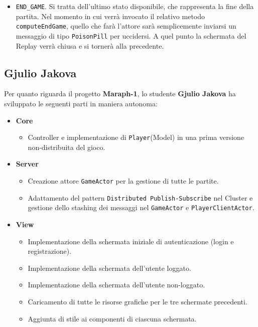 \begin{itemize}
\begin {itemize}
     \item \texttt{END\_GAME}. Si tratta dell'ultimo stato disponibile, che rappresenta la fine della partita. Nel momento in cui verrà invocato il relativo metodo \texttt{computeEndGame}, quello che farà l'attore sarà semplicemente inviarsi un messaggio di tipo \texttt{PoisonPill} per uccidersi. A quel punto la schermata del Replay verrà chiusa e si tornerà alla precedente.


          \end{itemize}


     \end{itemize}




     \clearpage
        \subsection{Gjulio Jakova}\label{subsec:jakova}

 Per quanto riguarda il progetto \textbf{Maraph-1}, lo studente \textbf{Gjulio Jakova} ha sviluppato le seguenti parti in maniera autonoma:

        \begin{itemize}
        \item \textbf{Core}
        		\begin {itemize}
		\item 	Controller e implementazione di \texttt{Player}(Model) in una prima versione non-distribuita del gioco.
     	\end {itemize}

     	\item \textbf{Server}
		\begin {itemize}
		\item Creazione attore \texttt{GameActor} per la gestione di tutte le partite.
		\item Adattamento del pattern \texttt{Distributed Publish-Subscribe} nel Cluster e gestione dello stashing dei messaggi nel \texttt{GameActor} e \texttt{PlayerClientActor}.
	\end {itemize}

	\item \textbf{View}
		\begin {itemize}
		\item Implementazione della schermata iniziale di autenticazione (login e registrazione).
		\item Implementazione della schermata dell’utente loggato.
		\item Implementazione della schermata dell’utente non-loggato.
		\item Caricamento di tutte le risorse grafiche per le tre schermate precedenti.
		\item Aggiunta di stile ai componenti di ciascuna schermata.
		\end{itemize}

     \end {itemize}

